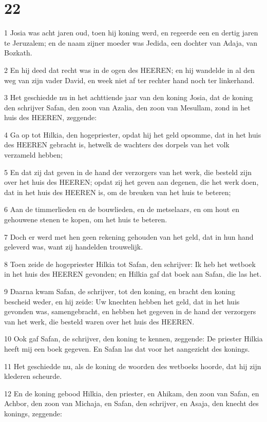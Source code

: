 \chapter{22}

\par 1 Josia was acht jaren oud, toen hij koning werd, en regeerde een en dertig jaren te Jeruzalem; en de naam zijner moeder was Jedida, een dochter van Adaja, van Bozkath.
\par 2 En hij deed dat recht was in de ogen des HEEREN; en hij wandelde in al den weg van zijn vader David, en week niet af ter rechter hand noch ter linkerhand.
\par 3 Het geschiedde nu in het achttiende jaar van den koning Josia, dat de koning den schrijver Safan, den zoon van Azalia, den zoon van Mesullam, zond in het huis des HEEREN, zeggende:
\par 4 Ga op tot Hilkia, den hogepriester, opdat hij het geld opsomme, dat in het huis des HEEREN gebracht is, hetwelk de wachters des dorpels van het volk verzameld hebben;
\par 5 En dat zij dat geven in de hand der verzorgers van het werk, die besteld zijn over het huis des HEEREN; opdat zij het geven aan degenen, die het werk doen, dat in het huis des HEEREN is, om de breuken van het huis te beteren;
\par 6 Aan de timmerlieden en de bouwlieden, en de metselaars, en om hout en gehouwene stenen te kopen, om het huis te beteren.
\par 7 Doch er werd met hen geen rekening gehouden van het geld, dat in hun hand geleverd was, want zij handelden trouwelijk.
\par 8 Toen zeide de hogepriester Hilkia tot Safan, den schrijver: Ik heb het wetboek in het huis des HEEREN gevonden; en Hilkia gaf dat boek aan Safan, die las het.
\par 9 Daarna kwam Safan, de schrijver, tot den koning, en bracht den koning bescheid weder, en hij zeide: Uw knechten hebben het geld, dat in het huis gevonden was, samengebracht, en hebben het gegeven in de hand der verzorgers van het werk, die besteld waren over het huis des HEEREN.
\par 10 Ook gaf Safan, de schrijver, den koning te kennen, zeggende: De priester Hilkia heeft mij een boek gegeven. En Safan las dat voor het aangezicht des konings.
\par 11 Het geschiedde nu, als de koning de woorden des wetboeks hoorde, dat hij zijn klederen scheurde.
\par 12 En de koning gebood Hilkia, den priester, en Ahikam, den zoon van Safan, en Achbor, den zoon van Michaja, en Safan, den schrijver, en Asaja, den knecht des konings, zeggende:
